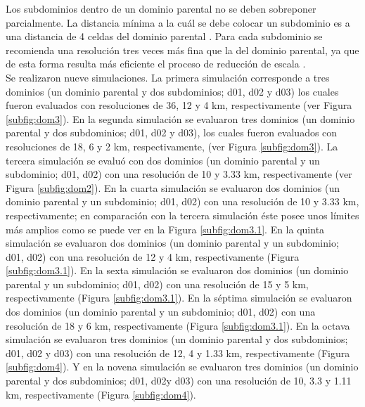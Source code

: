 Los subdominios dentro de un dominio parental no se deben sobreponer parcialmente. La distancia mínima a la cuál se debe colocar un subdominio es a una distancia de 4 celdas del dominio parental \citep{Werner2017}. Para cada subdominio se recomienda una resolución tres veces más fina que la del dominio parental, ya que de esta forma resulta más eficiente el proceso de reducción de escala \citep{Werner2017}.\\

Se realizaron nueve simulaciones. La primera simulación corresponde a tres dominios (un dominio parental y dos subdominios; d01, d02 y d03) los cuales fueron evaluados con resoluciones de 36, 12 y 4 km, respectivamente (ver Figura \ref{subfig:dom3}). En la segunda simulación se evaluaron tres dominios (un dominio parental y dos subdominios; d01, d02 y d03), los cuales fueron evaluados con resoluciones de 18, 6 y 2 km, respectivamente, (ver Figura \ref{subfig:dom3}). La tercera simulación se evaluó con dos dominios (un dominio parental y un subdominio; d01, d02) con una resolución de 10 y 3.33 km, respectivamente (ver Figura \ref{subfig:dom2}). En la cuarta simulación se evaluaron dos dominios (un dominio parental y un subdominio; d01, d02) con una resolución de 10 y 3.33 km, respectivamente; en comparación con la tercera simulación éste posee unos límites más amplios como se puede ver en la Figura \ref{subfig:dom3.1}. En la quinta simulación se evaluaron dos dominios (un dominio parental y un subdominio; d01, d02) con una resolución de 12 y 4 km, respectivamente (Figura \ref{subfig:dom3.1}). En la sexta simulación se evaluaron dos dominios (un dominio parental y un subdominio; d01, d02) con una resolución de 15 y 5 km, respectivamente (Figura \ref{subfig:dom3.1}). En la séptima simulación se evaluaron dos dominios (un dominio parental y un subdominio; d01, d02) con una resolución de 18 y 6 km, respectivamente (Figura \ref{subfig:dom3.1}). En la octava simulación se evaluaron tres dominios (un dominio parental y dos subdominios; d01, d02 y d03) con una resolución de 12, 4 y 1.33 km, respectivamente (Figura \ref{subfig:dom4}). Y en la novena simulación se evaluaron tres dominios (un dominio parental y dos subdominios; d01, d02y d03) con una resolución de 10, 3.3 y 1.11 km, respectivamente (Figura \ref{subfig:dom4}).\







